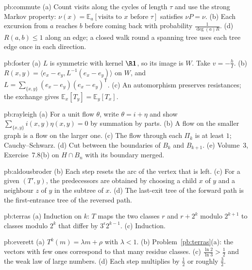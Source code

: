 \begin{hint}{pb:commute}
(a) Count visits along the cycles of length $\tau$ and use the strong Markov property: $\nu(x)=\mathbb E_a[\text{visits to }x\text{ before }\tau]$ satisfies $\nu P=\nu$. (b) Each
excursion from $a$ reaches $b$ before coming back with probability $\frac1{\deg(a)R}$. (d) $R(a,b)\le1$ along an edge; a closed walk round a
spanning tree uses each tree edge once in each direction.
\end{hint}

\begin{hint}{pb:foster}
(a) $L$ is symmetric with kernel $\R\mathbf1$, so its image is $W$. Take $v=-\frac hI$. (b) $R(x,y)=\langle e_x-e_y,L^{-1}(e_x-e_y)\rangle$ on $W$, and $L=\sum_{\{x,y\}}(e_x-e_y)(e_x-e_y)^{\mathsf T}$. (c) An
automorphism preserves resistances; the exchange gives $\mathbb E_x[T_y]=\mathbb E_y[T_x]$.
\end{hint}

\begin{hint}{pb:rayleigh}
(a) For a unit flow $\theta$, write $\theta=i+\eta$ and show $\sum_{\{x,y\}}i(x,y)\eta(x,y)=0$ by summation by parts. (b) A flow on the smaller graph is a flow on
the larger one. (c) The flow through each $\Pi_k$ is at least $1$; Cauchy--Schwarz. (d) Cut between the boundaries of $B_k$ and $B_{k+1}$. (e) Volume~3,
Exercise~7.8(b) on $H\cap B_n$ with its boundary merged.
\end{hint}

\begin{hint}{pb:aldousbroder}
(b) Each step resets the arc of the vertex that is left. (c) For a given $(T',y)$, the predecessors are obtained by choosing a child $x$ of $y$ and a
neighbour $z$ of $y$ in the subtree of $x$. (d) The last-exit tree of the forward path is the first-entrance tree of the reversed path.
\end{hint}

\begin{hint}{pb:terras}
(a) Induction on $k$: $T$ maps the two classes $r$ and $r+2^k$ modulo $2^{k+1}$ to classes modulo $2^k$ that differ by $3^{\epsilon}2^{k-1}$. (c) Induction.
\end{hint}

\begin{hint}{pb:everett}
(a) $T^k(m)=\lambda m+\rho$ with $\lambda<1$. (b) Problem~\ref{pb:terras}(a): the vectors with few ones correspond to that many residue classes. (c) $\frac{\ln2}{\ln3}>\frac12$ and the
weak law of large numbers. (d) Each step multiplies by $\frac12$ or roughly $\frac32$.
\end{hint}

